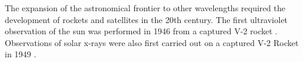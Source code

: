 The expansion of the astronomical frontier to other wavelengths required
the development of rockets and satellites in the 20th century.  The first
ultraviolet observation of the sun was performed in 1946 from a captured
V-2 rocket \citep{baum_1946_ultraviolet-spectrum}.  Observations of
solar x-rays were also first carried out on a captured V-2 Rocket in
1949 \citep{burnight_1949_x-radiation-atmosphere}.
